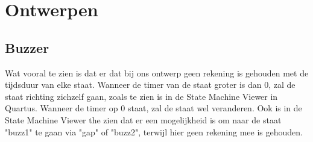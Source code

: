 \section{Ontwerpen}
\subsection{Buzzer}
Wat vooral te zien is dat er dat bij ons ontwerp geen rekening is gehouden met de tijdsduur van elke staat. Wanneer de timer van de staat groter is dan 0, zal de staat richting zichzelf gaan, zoals te zien is in de State Machine Viewer in Quartus. Wanneer de timer op 0 staat, zal de staat wel veranderen. Ook is in de State Machine Viewer the zien dat er een mogelijkheid is om naar de staat "buzz1" te gaan via "gap" of "buzz2", terwijl hier geen rekening mee is gehouden.